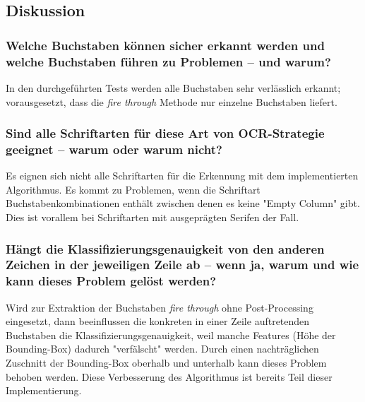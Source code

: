 \documentclass[german,notitlepage,smartquotes]{hgbreport}
\begin{document}
\clearpage

\subsection{Diskussion}

\subsubsection{Welche Buchstaben können sicher erkannt werden und welche Buchstaben führen zu Problemen -- und warum?}

In den durchgeführten Tests werden alle Buchstaben sehr verlässlich erkannt; vorausgesetzt, dass die \textit{fire through} Methode nur einzelne Buchstaben liefert.

\subsubsection{Sind alle Schriftarten für diese Art von OCR-Strategie geeignet -- warum oder warum nicht?}

Es eignen sich nicht alle Schriftarten für die Erkennung mit dem implementierten Algorithmus. Es kommt zu Problemen, wenn die Schriftart Buchstabenkombinationen enthält zwischen denen es keine "Empty Column" gibt. Dies ist vorallem bei Schriftarten mit ausgeprägten Serifen der Fall.

\subsubsection{Hängt die Klassifizierungsgenauigkeit von den anderen Zeichen in der jeweiligen Zeile ab -- wenn ja, warum und wie kann dieses Problem gelöst werden?}

Wird zur Extraktion der Buchstaben \textit{fire through} ohne Post-Processing eingesetzt, dann beeinflussen die konkreten in einer Zeile auftretenden Buchstaben die Klassifizierungsgenauigkeit, weil manche Features (\zB Höhe der Bounding-Box) dadurch "verfälscht" werden.
Durch einen nachträglichen Zuschnitt der Bounding-Box oberhalb und unterhalb kann dieses Problem behoben werden. Diese Verbesserung des Algorithmus ist bereits Teil dieser Implementierung.


\end{document}
